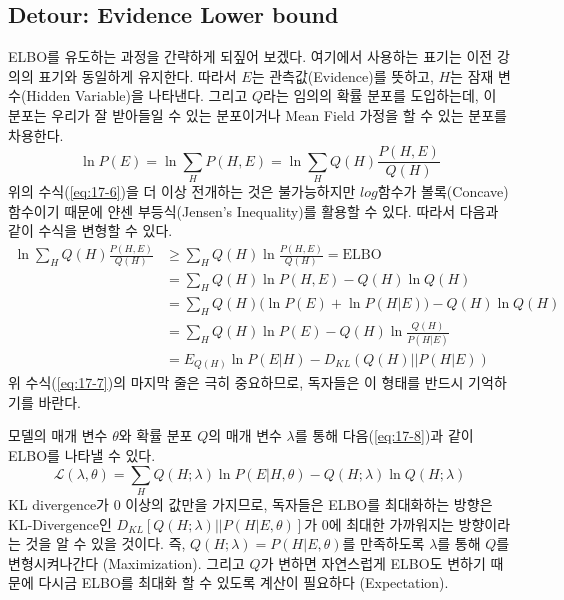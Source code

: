 \documentclass[draft=false]{oblivoir}
\begin{document}
\subsection{Detour: Evidence Lower bound}
ELBO를 유도하는 과정을 간략하게 되짚어 보겠다. 여기에서 사용하는 표기는 이전 강의의 표기와 동일하게 유지한다. 따라서 $E$는 관측값(Evidence)를 뜻하고, $H$는 잠재 변수(Hidden Variable)을 나타낸다. 그리고 $Q$라는 임의의 확률 분포를 도입하는데, 이 분포는 우리가 잘 받아들일 수 있는 분포이거나 Mean Field 가정을 할 수 있는 분포를 차용한다.
\begin{equation}
	\ln{P(E)} = \ln{\sum_{H}P(H,E)} = \ln{\sum_{H}Q(H)\frac{P(H,E)}{Q(H)}}
	\label{eq:17-6}
\end{equation}
위의 수식(\ref{eq:17-6})을 더 이상 전개하는 것은 불가능하지만 $log$함수가 볼록(Concave) 함수이기 때문에 얀센 부등식(Jensen's Inequality)를 활용할 수 있다. 따라서 다음과 같이 수식을 변형할 수 있다.
\begin{equation}
	\begin{split}
		\ln{\sum_{H}Q(H)\frac{P(H, E)}{Q(H)}}
        & \geq \sum_{H}Q(H)\ln{\frac{P(H,E)}{Q(H)}} = \mathrm{ELBO}\\
        & = \sum_{H}Q(H)\ln{P(H,E)} - Q(H)\ln{Q(H)}\\
        & = \sum_{H}Q(H)\big( \ln{P(E)} + \ln{P(H|E)}\big) - Q(H)\ln{Q(H)}\\
        & = \sum_{H}Q(H)\ln{P(E)} - Q(H)\ln{\frac{Q(H)}{P(H|E)}}\\
        & = E_{Q(H)}\ln{P(E|H)} - D_{KL}(Q(H) || P(H|E))
	\end{split}
	\label{eq:17-7}
\end{equation}
위 수식(\ref{eq:17-7})의 마지막 줄은 극히 중요하므로, 독자들은 이 형태를 반드시 기억하기를 바란다.

모델의 매개 변수 $\theta$와 확률 분포 $Q$의 매개 변수 $\lambda$를 통해 다음(\ref{eq:17-8})과 같이 ELBO를 나타낼 수 있다.
\begin{equation}
	\mathcal{L}(\lambda, \theta) = \sum_{H}Q(H; \lambda)\ln{P(E|H,\theta)} - Q(H; \lambda) \ln{Q(H; \lambda)}
	\label{eq:17-8}
\end{equation}
KL divergence가 0 이상의 값만을 가지므로, 독자들은 ELBO를 최대화하는 방향은 KL-Divergence인 $D_{KL}[Q(H; \lambda)||P(H|E,\theta)]$가 0에 최대한 가까워지는 방향이라는 것을 알 수 있을 것이다. 즉, $Q(H; \lambda) = P(H|E, \theta)$를 만족하도록 $\lambda$를 통해 $Q$를 변형시켜나간다 (Maximization). 그리고 $Q$가 변하면 자연스럽게 ELBO도 변하기 때문에 다시금 ELBO를 최대화 할 수 있도록 계산이 필요하다 (Expectation).
\end{document}
